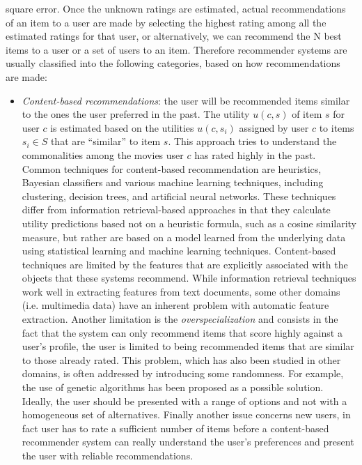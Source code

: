 \documentclass[paper=a4, fontsize=11pt]{scrartcl} %
\numberwithin{equation}{section} %
\numberwithin{figure}{section} %
\numberwithin{table}{section} %
\begin{document}
square error. Once the unknown ratings are estimated, actual recommendations of
an item to a user are made by selecting the highest rating among all the
estimated ratings for that user, or alternatively, we can recommend the N best
items to a user or a set of users to an item. Therefore recommender systems are
usually classified into the following categories, based on how recommendations
are made:
\begin{itemize}
  \item \textit{Content-based recommendations}: the user will be
recommended items similar to the ones the user preferred in the past. The
utility $u(c,s)$ of item $s$ for user $c$ is estimated based on the utilities
$u(c,s_i)$ assigned by user $c$ to items $s_i \in S$ that are ``similar'' to
item $s$. This approach tries to understand the commonalities among the movies
user $c$ has rated highly in the past. Common techniques for content-based
recommendation are heuristics, Bayesian classifiers and various machine learning
techniques, including clustering, decision trees, and artificial neural
networks. These techniques differ from information retrieval-based approaches in
that they calculate utility predictions based not on a heuristic formula, such
as a cosine similarity measure, but rather are based on a model learned from the
underlying data using statistical learning and machine learning techniques.
Content-based techniques are limited by the features that are explicitly
associated with the objects that these systems recommend. While information
retrieval techniques work well in extracting features from text documents, some
other domains (i.e. multimedia data) have an inherent problem with automatic
feature extraction. Another limitation is the \textit{overspecialization} and
consists in the fact that the system can only recommend items that score highly
against a user's profile, the user is limited to being recommended items that
are similar to those already rated. This problem, which has also been studied in
other domains, is often addressed by introducing some randomness. For example,
the use of genetic algorithms has been proposed as a possible solution. Ideally,
the user should be presented with a range of options and not with a homogeneous
set of alternatives. Finally another issue concerns new users, in fact user has
to rate a sufficient number of items before a content-based recommender system
can really understand the user's preferences and present the user with reliable
recommendations.


\end{itemize}
\end{document}
